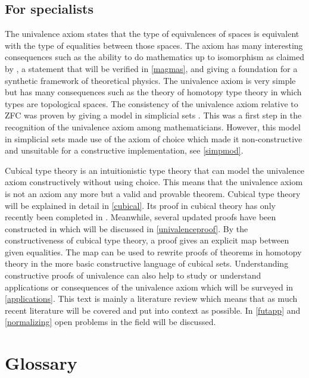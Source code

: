 \documentclass[12pt,a4paper,twoside,xetex]{book} %
\begin{document}
\section*{For specialists}

The univalence axiom states that the type of equivalences of spaces is equivalent with the type of equalities between those spaces. The axiom has many interesting consequences such as the ability to do mathematics up to isomorphism as claimed by \cite{Voevodsky2013}, a statement that will be verified in \cref{magmas}, and giving a foundation for a synthetic framework of theoretical physics. The univalence axiom is very simple but has many consequences such as the theory of homotopy type theory in which types are topological spaces. The  consistency of the univalence axiom relative to ZFC was proven by giving a model in simplicial sets \cite{Kapulkin2012}. This was a first step in the recognition of the univalence axiom among mathematicians. However, this model in simplicial sets made use of the axiom of choice which made it non-constructive and unsuitable for a constructive implementation, see \cref{simpmod}.

Cubical type theory is an intuitionistic type theory that can model the univalence axiom constructively without using choice. This means that the univalence axiom is not an axiom any more but a valid and provable theorem. Cubical type theory will be explained in detail in \cref{cubical}. Its proof in cubical theory has only recently been completed in \cite{Cohen2016}. Meanwhile, several updated proofs have been constructed in \cite{Sterling2018b, Moertberg2018} which will be discussed in \cref{univalenceproof}. By the constructiveness of cubical type theory, a proof gives an explicit map between given equalities. The map can be used to rewrite proofs of theorems in homotopy theory in the more basic constructive language of cubical sets. Understanding constructive proofs of univalence can also help to study or understand applications or consequences of the univalence axiom which will be surveyed in \cref{applications}. This text is mainly a literature review which means that as much recent literature will be covered and put into context as possible. In \cref{futapp} and \cref{normalizing} open problems in the field will be discussed.

\chapter*{Glossary}
\end{document}

